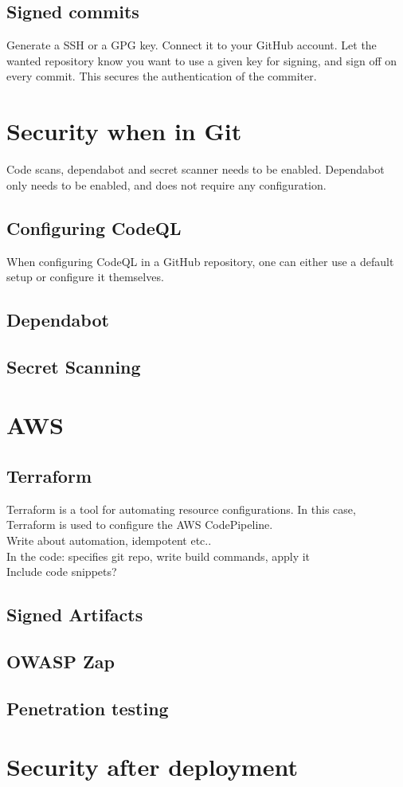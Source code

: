 \subsection{Signed commits}
Generate a SSH or a GPG key. Connect it to your GitHub account. Let the wanted repository know you want to use a given key for signing, and sign off on every commit. This secures the authentication of the commiter. 

\section{Security when in Git}
Code scans, dependabot and secret scanner needs to be enabled. Dependabot only needs to be enabled, and does not require any configuration. 

\subsection{Configuring CodeQL}
When configuring CodeQL in a GitHub repository, one can either use a default setup or configure it themselves. 

\subsection{Dependabot}

\subsection{Secret Scanning}


\section{AWS}
\subsection{Terraform}
Terraform is a tool for automating resource configurations. In this case, Terraform is used to configure the AWS CodePipeline. \\
Write about automation, idempotent etc.. \\
In the code: specifies git repo, write build commands, apply it \\
Include code snippets?

\subsection{Signed Artifacts}


\subsection{OWASP Zap}


\subsection{Penetration testing}

\section{Security after deployment}